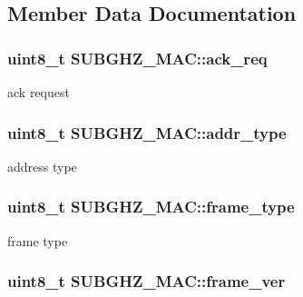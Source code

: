 \subsection{Member Data Documentation}
\hypertarget{structSUBGHZ__MAC_a775d5e27420a0352b1253afd211079dc}{
\subsubsection[{ack\+\_\+req}]{\setlength{\rightskip}{0pt plus 5cm}uint8\+\_\+t S\+U\+B\+G\+H\+Z\+\_\+\+M\+A\+C\+::ack\+\_\+req}}\label{structSUBGHZ__MAC_a775d5e27420a0352b1253afd211079dc}
ack request \hypertarget{structSUBGHZ__MAC_a687f57732f46f092de4e12114740955e}{
\subsubsection[{addr\+\_\+type}]{\setlength{\rightskip}{0pt plus 5cm}uint8\+\_\+t S\+U\+B\+G\+H\+Z\+\_\+\+M\+A\+C\+::addr\+\_\+type}}\label{structSUBGHZ__MAC_a687f57732f46f092de4e12114740955e}
address type \hypertarget{structSUBGHZ__MAC_a8250b42914e940479b1552170ac0b231}{
\subsubsection[{frame\+\_\+type}]{\setlength{\rightskip}{0pt plus 5cm}uint8\+\_\+t S\+U\+B\+G\+H\+Z\+\_\+\+M\+A\+C\+::frame\+\_\+type}}\label{structSUBGHZ__MAC_a8250b42914e940479b1552170ac0b231}
frame type \hypertarget{structSUBGHZ__MAC_a1bba4ec774ab6c7ad5b97185e5e033f6}{
\subsubsection[{frame\+\_\+ver}]{\setlength{\rightskip}{0pt plus 5cm}uint8\+\_\+t S\+U\+B\+G\+H\+Z\+\_\+\+M\+A\+C\+::frame\+\_\+ver}}\label{structSUBGHZ__MAC_a1bba4ec774ab6c7ad5b97185e5e033f6}
